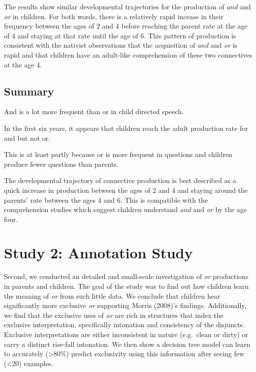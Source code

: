 \documentclass[10pt, letterpaper]{article}
\begin{document}
The results show similar developmental trajectories for the production
of \emph{and} and \emph{or} in children. For both words, there is a
relatively rapid incease in their frequency between the ages of 2 and 4
before reaching the parent rate at the age of 4 and staying at that rate
until the age of 6. This pattern of production is consistent with the
nativist observations that the acquisition of \emph{and} and \emph{or}
is rapid and that children have an adult-like comprehension of these two
connectives at the age 4.

\subsection{Summary}\label{summary}

And is a lot more frequent than or in child directed speech.

In the first six years, it appears that children reach the adult
production rate for and but not or.

This is at least partly because or is more frequent in questions and
children produce fewer questions than parents.

The developmental trajectory of connective production is best described
as a quick increase in production between the ages of 2 and 4 and
staying around the parents' rate between the ages 4 and 6. This is
compatible with the comprehension studies which suggest children
understand \emph{and} and \emph{or} by the age four.

\section{Study 2: Annotation Study}\label{study-2-annotation-study}

Second, we conducted an detailed and small-scale investigation of
\emph{or} productions in parents and children. The goal of the study was
to find out how children learn the meaning of \emph{or} from such little
data. We conclude that children hear significantly more exclusive
\emph{or} supporting Morris (2008)'s findings. Additionally, we find
that the exclusive uses of \emph{or} are rich in structures that index
the exclusive interpretation, specifically intonation and consistency of
the disjuncts. Exclusive interpretations are either inconsistent in
nature (e.g.~clean or dirty) or carry a distinct rise-fall intonation.
We then show a decision tree model can learn to accurately
(\textgreater{}80\%) predict exclusivity using this information after
seeing few (\textless{}20) examples.
\end{document}
